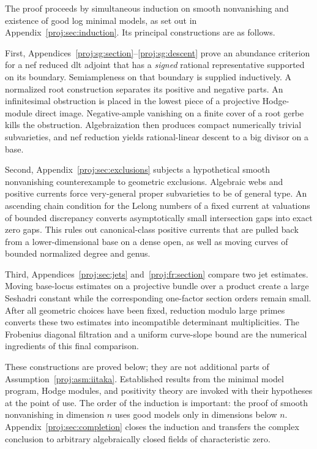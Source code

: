 \documentclass[11pt,letterpaper]{article}
\theoremstyle{definition}
\theoremstyle{remark}
\begin{document}
The proof proceeds by simultaneous induction on smooth nonvanishing
and existence of good log minimal models, as set out in
Appendix~\ref{proj:sec:induction}. Its principal constructions are as follows.

First, Appendices~\ref{proj:sg:section}--\ref{proj:sg:descent} prove an abundance
criterion for a nef reduced dlt adjoint
that has a \emph{signed} rational representative supported on its
boundary. Semiampleness on that boundary is supplied inductively.
A normalized root construction separates its positive and negative
parts. An infinitesimal obstruction is placed in the lowest piece of
a projective Hodge-module direct image. Negative-ample vanishing on
a finite cover of a root gerbe kills the obstruction. Algebraization
then produces compact numerically trivial subvarieties, and nef
reduction yields rational-linear descent to a big divisor on a base.

Second, Appendix~\ref{proj:sec:exclusions} subjects a hypothetical smooth
nonvanishing counterexample to geometric exclusions. Algebraic webs and positive currents force
very-general proper subvarieties to be of general type. An ascending
chain condition for the Lelong numbers of a fixed current at valuations
of bounded discrepancy converts asymptotically small intersection gaps
into exact zero gaps. This rules out canonical-class positive currents
that are pulled back from a lower-dimensional base on a dense open,
as well as moving curves of bounded normalized degree and genus.

Third, Appendices~\ref{proj:sec:jets} and~\ref{proj:fr:section} compare two jet
estimates. Moving base-locus estimates on a projective bundle over a
product create a large Seshadri constant while the corresponding
one-factor section orders remain small. After all geometric choices
have been fixed, reduction modulo large primes converts these two
estimates into incompatible determinant multiplicities. The Frobenius
diagonal filtration and a uniform curve-slope bound are the numerical
ingredients of this final comparison.

These constructions are proved below; they are not additional parts
of Assumption~\ref{proj:asm:iitaka}. Established results from the minimal
model program, Hodge modules, and positivity theory are invoked with
their hypotheses at the point of use. The order of the induction is
important: the proof of smooth nonvanishing in dimension \(n\) uses
good models only in dimensions below \(n\).
Appendix~\ref{proj:sec:completion} closes the induction and transfers the
complex conclusion to arbitrary algebraically closed fields of
characteristic zero.
\end{document}
